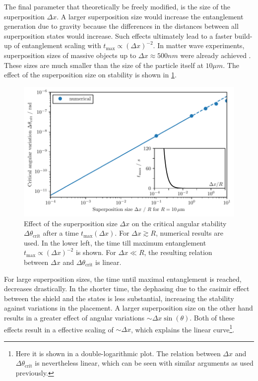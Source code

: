 The final parameter that theoretically be freely modified, is the size of the superposition $\Delta x$. A larger superposition size would increase the entanglement generation due to gravity because the differences in the distances between all superposition states would increase. Such effects ultimately lead to a faster build-up of entanglement scaling with $t_\mathrm{max} \propto (\Delta x)^{-2}$.
In matter wave experiments, superposition sizes of massive objects up to $\Delta x \approx 500\si{nm}$ were already achieved \cite{Fein_2019}.
These sizes are much smaller than the size of the particle itself at $10\si{\mu m}$.
The effect of the superposition size on stability is shown in \cref{fig:4:theta-crit-superposition-size}.
\begin{figure}[!htbp]
  \centering
  \includegraphics[width=\textwidth]{./../figures/theta-variance/theta-crit-superpos-size.pdf}
  \caption{Effect of the superposition size $\Delta x$ on the critical angular stability $\Delta \theta_\mathrm{crit}$ after a time $t_\mathrm{max}(\Delta x)$. For $\Delta x \gtrsim R$, numerical results are used. In the lower left, the time till maximum entanglement $t_\mathrm{max} \propto (\Delta x)^{-2}$ is shown. For $\Delta x \ll R$, the resulting relation between $\Delta x$ and $\Delta \theta_\mathrm{crit}$ is linear.}
  \label{fig:4:theta-crit-superposition-size}
\end{figure}
For large superposition sizes, the time until maximal entanglement is reached, decreases drastically. In the shorter time, the dephasing due to the casimir effect between the shield and the states is less substantial, increasing the stability against variations in the placement.
A larger superposition size on the other hand results in a greater effect of angular variations $\sim \Delta x \sin(\theta)$.
Both of these effects result in a effective scaling of $\sim \Delta x$, which explains the linear curve\footnote{Here it is shown in a double-logarithmic plot. The relation between $\Delta x$ and $\Delta \theta_\mathrm{crit}$ is nevertheless linear, which can be seen with similar arguments as used previously.}.



